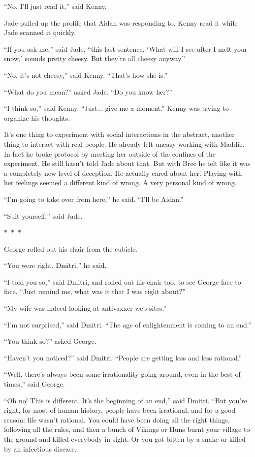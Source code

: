 \documentclass{memoir}
\newcommand{\starbreak}{%
\begin{center}
  $\ast$~$\ast$~$\ast$
\end{center}
}
\begin{document}
``No. I'll just read it,'' said Kenny.

Jade pulled up the profile that Aidan was responding to. Kenny read it while Jade scanned it quickly.

``If you ask me,'' said Jade, ``this last sentence, `What will I see after I melt your snow,' sounds pretty cheesy. But they're all cheesy anyway.''

``No, it's not cheesy,'' said Kenny. ``That's how she is.''

``What do you mean?'' asked Jade. ``Do you know her?''

``I think so,'' said Kenny. ``Just... give me a moment.'' Kenny was trying to organize his thoughts. 

It's one thing to experiment with social interactions in the abstract, another thing to interact with real people. He already felt uneasy working with Maddie. In fact he broke protocol by meeting her outside of the confines of the experiment. He still hasn't told Jade about that. But with Bree he felt like it was a completely new level of deception. He actually cared about her. Playing with her feelings seemed a different kind of wrong. A very personal kind of wrong.

``I'm going to take over from here,'' he said. ``I'll be Aidan.''

``Suit yourself,'' said Jade.

\starbreak

George rolled out his chair from the cubicle.

``You were right, Dmitri,'' he said.

``I told you so,'' said Dmitri, and rolled out his chair too, to see George face to face. ``Just remind me, what was it that I was right about?''

``My wife was indeed looking at antivaxxer web sites.''

``I'm not surprised,'' said Dmitri. ``The age of enlightenment is coming to an end.''

``You think so?'' asked George.

``Haven't you noticed?'' said Dmitri. ``People are getting less and less rational.''

``Well, there's always been some irrationality going around, even in the best of times,'' said George.

``Oh no! This is different. It's the beginning of an end,'' said Dmitri. ``But you're right, for most of human history, people have been irrational, and for a good reason: life wasn't rational. You could have been doing all the right things, following all the rules, and then a bunch of Vikings or Huns burnt your village to the ground and killed everybody in sight. Or you got bitten by a snake or killed by an infectious disease. 
\end{document}
